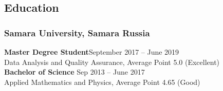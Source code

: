 \subsection*{Education}
    \subsubsection*{Samara University, Samara Russia}
    \textbf{Master Degree Student}\hfill \hfill September 2017 -- June 2019\\
    Data Analysis and Quality Assurance, Average Point 5.0 (Excellent)\\
    \textbf{Bachelor of Science} \hfill Sep 2013 -- June 2017\\
    Applied Mathematics and Physics, Average Point 4.65 (Good)
